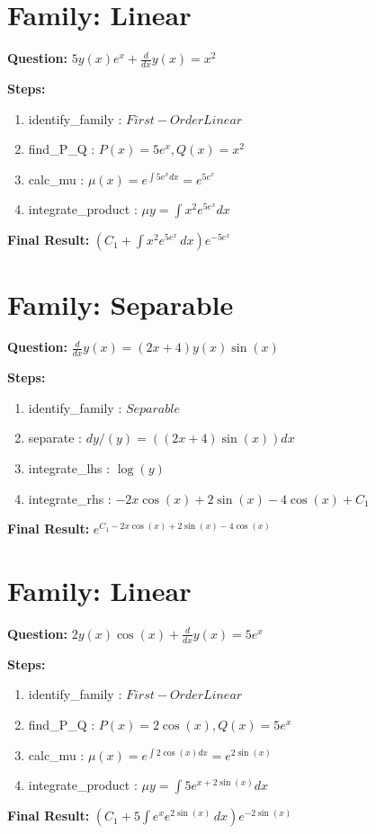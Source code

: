 \documentclass{article}
\begin{document}
\section*{Family: Linear}
\textbf{Question:} $5 y{\left(x \right)} e^{x} + \frac{d}{d x} y{\left(x \right)} = x^{2}$

\textbf{Steps:}
\begin{enumerate}
\item identify_family :  $First-Order Linear$
\item find_P_Q :  $P(x)=5 e^{x}, Q(x)=x^{2}$
\item calc_mu :  $\mu(x) = e^{\int 5 e^{x} dx} = e^{5 e^{x}}$
\item integrate_product :  $\mu y = \int x^{2} e^{5 e^{x}} dx$
\end{enumerate}
\textbf{Final Result:} $\left(C_{1} + \int x^{2} e^{5 e^{x}}\, dx\right) e^{- 5 e^{x}}$

\section*{Family: Separable}
\textbf{Question:} $\frac{d}{d x} y{\left(x \right)} = \left(2 x + 4\right) y{\left(x \right)} \sin{\left(x \right)}$

\textbf{Steps:}
\begin{enumerate}
\item identify_family :  $Separable$
\item separate :  $dy / (y) = (\left(2 x + 4\right) \sin{\left(x \right)}) dx$
\item integrate_lhs :  $\log{\left(y \right)}$
\item integrate_rhs :  $- 2 x \cos{\left(x \right)} + 2 \sin{\left(x \right)} - 4 \cos{\left(x \right)} + C_1$
\end{enumerate}
\textbf{Final Result:} $e^{C_{1} - 2 x \cos{\left(x \right)} + 2 \sin{\left(x \right)} - 4 \cos{\left(x \right)}}$

\section*{Family: Linear}
\textbf{Question:} $2 y{\left(x \right)} \cos{\left(x \right)} + \frac{d}{d x} y{\left(x \right)} = 5 e^{x}$

\textbf{Steps:}
\begin{enumerate}
\item identify_family :  $First-Order Linear$
\item find_P_Q :  $P(x)=2 \cos{\left(x \right)}, Q(x)=5 e^{x}$
\item calc_mu :  $\mu(x) = e^{\int 2 \cos{\left(x \right)} dx} = e^{2 \sin{\left(x \right)}}$
\item integrate_product :  $\mu y = \int 5 e^{x + 2 \sin{\left(x \right)}} dx$
\end{enumerate}
\textbf{Final Result:} $\left(C_{1} + 5 \int e^{x} e^{2 \sin{\left(x \right)}}\, dx\right) e^{- 2 \sin{\left(x \right)}}$
\end{document}

